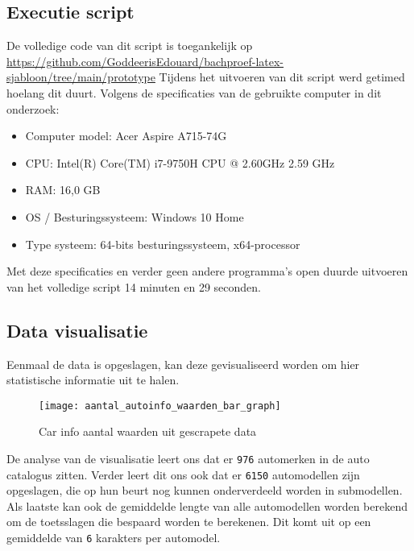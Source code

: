 \subsection{Executie script}
De volledige code van dit script is toegankelijk op \href{github}{https://github.com/GoddeerisEdouard/bachproef-latex-sjabloon/tree/main/prototype}
Tijdens het uitvoeren van dit script werd getimed hoelang dit duurt.
Volgens de specificaties van de gebruikte computer in dit onderzoek:
\begin{itemize}
	\item Computer model: Acer Aspire A715-74G
	\item CPU: Intel(R) Core(TM) i7-9750H CPU @ 2.60GHz   2.59 GHz
	\item RAM: 16,0 GB 
	\item OS / Besturingssysteem: Windows 10 Home
	\item Type systeem: 64-bits besturingssysteem, x64-processor
\end{itemize}
Met deze specificaties en verder geen andere programma's open duurde uitvoeren van het volledige script 14 minuten en 29 seconden.

\subsection{Data visualisatie}
Eenmaal de data is opgeslagen, kan deze gevisualiseerd worden om hier statistische informatie uit te halen. 
\begin{figure}[H]
	\centering
	\texttt{[image: aantal\_autoinfo\_waarden\_bar\_graph]}
	\caption{Car info aantal waarden uit gescrapete data}
\end{figure}
De analyse van de visualisatie leert ons dat er \texttt{976} automerken in de auto catalogus zitten. Verder leert dit ons ook dat er \texttt{6150} automodellen zijn opgeslagen, die op hun beurt nog kunnen onderverdeeld worden in submodellen. Als laatste kan ook de gemiddelde lengte van alle automodellen worden berekend om de toetsslagen die bespaard worden te berekenen. Dit komt uit op een gemiddelde van \texttt{6} karakters per automodel.


